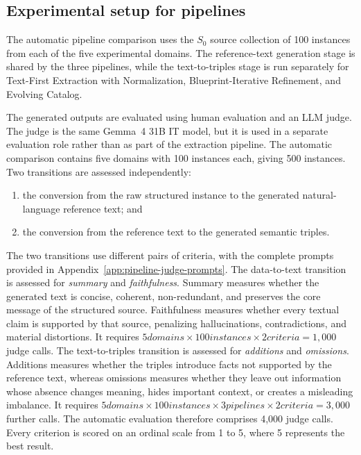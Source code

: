 \subsection{Experimental setup for pipelines}
\label{sec:experimental-setup}

The automatic pipeline comparison uses the $S_0$ source collection of 100 instances from each of the five
experimental domains. The reference-text generation stage is shared by the
three pipelines, while the text-to-triples stage is run separately for
Text-First Extraction with Normalization, Blueprint-Iterative Refinement, and
Evolving Catalog.

The generated outputs are evaluated using human evaluation and an LLM judge. The
judge is the same Gemma~4 31B IT model, but it is used in a separate evaluation
role rather than as part of the extraction pipeline. The automatic comparison
contains five domains with 100 instances each, giving 500 instances. Two
transitions are assessed independently:

\begin{enumerate}
    \item the conversion from the raw structured instance to the generated
    natural-language reference text; and
    \item the conversion from the reference text to the generated semantic
    triples.
\end{enumerate}

The two transitions use different pairs of criteria, with the complete prompts
provided in Appendix~\ref{app:pipeline-judge-prompts}. The data-to-text
transition is assessed for \emph{summary} and \emph{faithfulness}. Summary
measures whether the generated text is concise, coherent, non-redundant, and
preserves the core message of the structured source. Faithfulness measures
whether every textual claim is supported by that source, penalizing
hallucinations, contradictions, and material distortions.
It requires $5 domains \times 100 instances \times 2 criteria = 1{,}000$
judge calls.
The text-to-triples
transition is assessed for \emph{additions} and \emph{omissions}. Additions
measures whether the triples introduce facts not supported by the reference
text, whereas omissions measures whether they leave out information whose
absence changes meaning, hides important context, or creates a misleading
imbalance.
It requires $5 domains \times 100 instances \times 3 pipelines \times 2 criteria = 3{,}000$ further
calls. The automatic evaluation therefore comprises 4,000 judge calls.
Every criterion is scored on an ordinal scale from 1 to 5, where 5
represents the best result.

